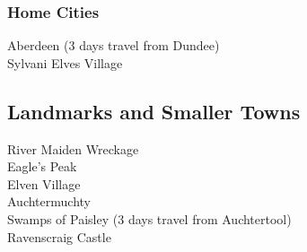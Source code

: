 \documentclass[letterpaper,openany,twoside,twocolumn]{book}
\begin{document}
	\subsubsection*{Home Cities}
	 {\entryfont Aberdeen (3 days travel from Dundee)}\\
	 {\entryfont Sylvani Elves Village}\\
	\subsection*{Landmarks and Smaller Towns}
	 {\entryfont River Maiden Wreckage}\\
	 {\entryfont Eagle's Peak}\\
	 {\entryfont Elven Village}\\
	 {\entryfont Auchtermuchty}\\
	 {\entryfont Swamps of Paisley (3 days travel from Auchtertool)}\\
	 {\entryfont Ravenscraig Castle}\\
\end{document}
